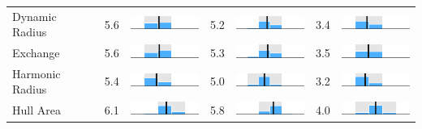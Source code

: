 \begin{table}
\begin{tabular}{l rm{7em} rm{7em} rm{7em}}
Dynamic Radius         &   5.6 &   \includegraphics[width=7em]{mini_hist/MN_2008_dyn_radius} &   5.2 &   \includegraphics[width=7em]{mini_hist/MN_2012_dyn_radius} &   3.4 &   \includegraphics[width=7em]{mini_hist/MN_2016_dyn_radius} \\
Exchange               &   5.6 &     \includegraphics[width=7em]{mini_hist/MN_2008_exchange} &   5.3 &     \includegraphics[width=7em]{mini_hist/MN_2012_exchange} &   3.5 &     \includegraphics[width=7em]{mini_hist/MN_2016_exchange} \\
Harmonic Radius        &   5.4 &  \includegraphics[width=7em]{mini_hist/MN_2008_harm_radius} &   5.0 &  \includegraphics[width=7em]{mini_hist/MN_2012_harm_radius} &   3.2 &  \includegraphics[width=7em]{mini_hist/MN_2016_harm_radius} \\
Hull Area              &   6.1 &       \includegraphics[width=7em]{mini_hist/MN_2008_hull_a} &   5.8 &       \includegraphics[width=7em]{mini_hist/MN_2012_hull_a} &   4.0 &       \includegraphics[width=7em]{mini_hist/MN_2016_hull_a} \\

\end{tabular}
\end{table}
